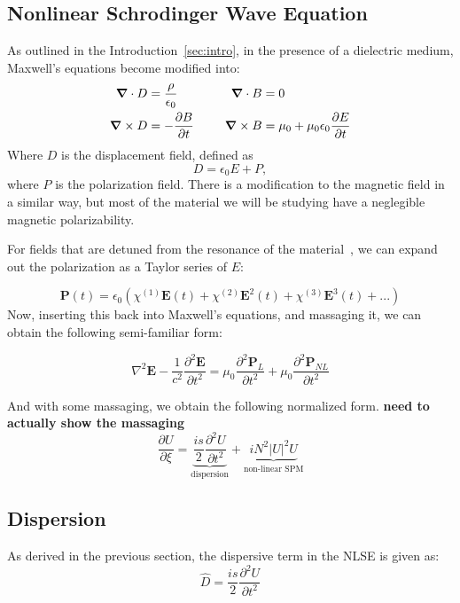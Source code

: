 \documentclass[12pt, titlepage]{article}
\renewcommand{\v}[1]{\ensuremath{\mathbf{#1}}} %
\renewcommand{\pd}[2]{\frac{\partial #1}{\partial #2}}
\newcommand{\pdd}[2]{\frac{\partial^2 #1}{\partial #2^2}}
\newcommand{\gv}[1]{\ensuremath{\mbox{\boldmath$ #1 $}}}
\renewcommand{\div}[1]{\gv{\nabla} \cdot #1} %
\newcommand{\curl}[1]{\gv{\nabla} \times #1} %
\begin{document}
\begin{spacing}{1.1}
\section{Nonlinear Schrodinger Wave Equation}
As outlined in the Introduction~\ref{sec:intro}, in the presence of a dielectric medium, Maxwell's equations become modified into:\begin{alignat}{2}
       \div{D} &= \frac{\rho}{\epsilon_0} &\qquad \div{B} &=0\\
       \curl{D} &=- \pd{B}{t}  & \curl{B} &= \mu_0 + \mu_0 \epsilon_0 \pd{E}{t} 
       \end{alignat}
Where $D$ is the displacement field, defined as 
\begin{equation}
D = \epsilon_0 E + P,
\end{equation}
where $P$ is the polarization field. 
There is a modification to the magnetic field in a similar way, but most of the material we will be studying have a
neglegible magnetic polarizability.

For fields that are detuned from the resonance of the material~\cite{boyd}, we can expand out the polarization as a Taylor series of $E$:

\begin{equation}
\v{P}(t) = \epsilon_0  \left( \chi^{(1)} \v{E}(t) + \chi^{(2)} \v{E}^2(t) + \chi^{(3)} \v{E}^3(t) +...\right)
\end{equation}
Now, inserting this back into Maxwell's equations, and massaging it, we can obtain the following semi-familiar form:

\begin{equation}
\nabla^2 \v{E} - \frac{1}{c^2} \pdd{\v{E}}{t} = \mu_0 \pdd{\v{P}_L}{t} + \mu_0 \pdd{\v{P}_{NL}}{t}
\end{equation}

And with some massaging, we obtain the following normalized form. \textbf{need to actually show the massaging}
\begin{equation}
\label{nlse}
\pd{U}{\xi}= \underbrace{\frac{is}{2} \pdd{U}{t}}_\text{dispersion} + \underbrace{i N^2 |U|^2U}_\text{non-linear SPM} 
\end{equation}

\subsection{Dispersion}

As derived in the previous section, the dispersive term in the NLSE is given as:
\[
\hat{D} = \frac{is}{2}\pdd{U}{t}
\]


\end{spacing}
\end{document}
